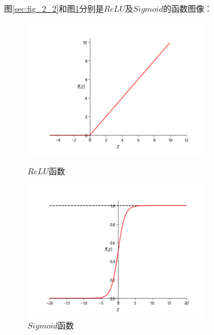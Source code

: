 图\ref{sec:fig_2_2}和图\ref{sec:fig_2_3}分别是$ReLU$及$Sigmoid$的函数图像：
\begin{figure}[htbp]
	\centering
	\begin{minipage}[t]{0.48\textwidth}
		\centering
		\includegraphics[width=8cm]{figures/chapter_2/fig_2_2.png}
		\caption{$ReLU$函数}\label{sec:fig_2_2}
	\end{minipage}
	\begin{minipage}[t]{0.48\textwidth}
		\centering
		\includegraphics[width=8cm]{figures/chapter_2/fig_2_3.png}
		\caption{$Sigmoid$函数}\label{sec:fig_2_3}
	\end{minipage}
\end{figure}

